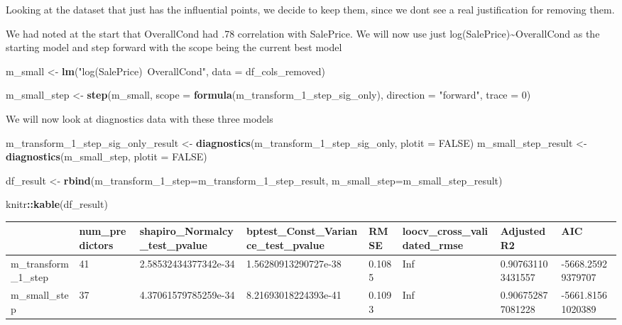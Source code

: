 \documentclass[
]{article}
\newenvironment{Shaded}{\begin{snugshade}}{\end{snugshade}}
\newcommand{\DataTypeTok}[1]{\textcolor[rgb]{0.13,0.29,0.53}{#1}}
\newcommand{\DecValTok}[1]{\textcolor[rgb]{0.00,0.00,0.81}{#1}}
\newcommand{\KeywordTok}[1]{\textcolor[rgb]{0.13,0.29,0.53}{\textbf{#1}}}
\newcommand{\NormalTok}[1]{#1}
\newcommand{\OperatorTok}[1]{\textcolor[rgb]{0.81,0.36,0.00}{\textbf{#1}}}
\newcommand{\OtherTok}[1]{\textcolor[rgb]{0.56,0.35,0.01}{#1}}
\newcommand{\StringTok}[1]{\textcolor[rgb]{0.31,0.60,0.02}{#1}}
\begin{document}
Looking at the dataset that just has the influential points, we decide to keep them, since we dont see a real justification for removing them.

We had noted at the start that OverallCond had .78 correlation with SalePrice. We will now use just log(SalePrice)\textasciitilde OverallCond as the starting model and step forward with the scope being the current best model

\begin{Shaded}
\begin{Highlighting}[]
\NormalTok{m_small <-}\StringTok{ }\KeywordTok{lm}\NormalTok{(}\StringTok{"log(SalePrice)~OverallCond"}\NormalTok{, }\DataTypeTok{data =}\NormalTok{ df_cols_removed)}

\NormalTok{m_small_step <-}\StringTok{ }\KeywordTok{step}\NormalTok{(m_small, }\DataTypeTok{scope =} \KeywordTok{formula}\NormalTok{(m_transform_}\DecValTok{1}\NormalTok{_step_sig_only), }\DataTypeTok{direction =} \StringTok{"forward"}\NormalTok{, }\DataTypeTok{trace =} \DecValTok{0}\NormalTok{)}
\end{Highlighting}
\end{Shaded}

We will now look at diagnostics data with these three models

\begin{Shaded}
\begin{Highlighting}[]
\NormalTok{m_transform_}\DecValTok{1}\NormalTok{_step_sig_only_result <-}\StringTok{ }\KeywordTok{diagnostics}\NormalTok{(m_transform_}\DecValTok{1}\NormalTok{_step_sig_only, }\DataTypeTok{plotit =} \OtherTok{FALSE}\NormalTok{)}
\NormalTok{m_small_step_result <-}\StringTok{ }\KeywordTok{diagnostics}\NormalTok{(m_small_step, }\DataTypeTok{plotit =} \OtherTok{FALSE}\NormalTok{)}

\NormalTok{df_result <-}\StringTok{ }\KeywordTok{rbind}\NormalTok{(}\DataTypeTok{m_transform_1_step=}\NormalTok{m_transform_}\DecValTok{1}\NormalTok{_step_result, }\DataTypeTok{m_small_step=}\NormalTok{m_small_step_result)}

\NormalTok{knitr}\OperatorTok{::}\KeywordTok{kable}\NormalTok{(df_result)}
\end{Highlighting}
\end{Shaded}

\begin{tabular}{l|l|l|l|l|l|l|l}
\hline
  & num\_predictors & shapiro\_Normalcy\_test\_pvalue & bptest\_Const\_Variance\_test\_pvalue & RMSE & loocv\_cross\_validated\_rmse & AdjustedR2 & AIC\\
\hline
m\_transform\_1\_step & 41 & 2.58532434377342e-34 & 1.56280913290727e-38 & 0.1085 & Inf & 0.907631103431557 & -5668.25929379707\\
\hline
m\_small\_step & 37 & 4.37061579785259e-34 & 8.21693018224393e-41 & 0.1093 & Inf & 0.906752877081228 & -5661.81561020389\\
\hline
\end{tabular}
\end{document}
